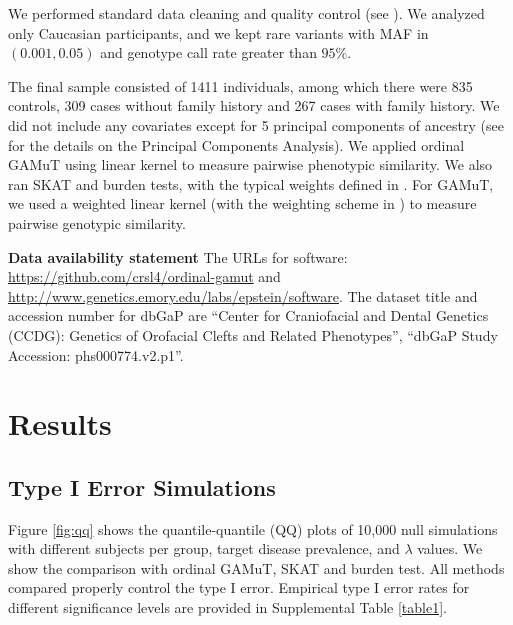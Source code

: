 \documentclass[]{article}
\begin{document}
We performed standard data cleaning and quality control (see \citet{Leslie2016}). We analyzed only Caucasian participants, and we kept rare variants with MAF in \((0.001,0.05)\) and genotype call rate greater than \(95\%\).

The final sample consisted of 1411 individuals, among which there were 835 controls, 309 cases without family history and 267 cases with family history. We did not include any covariates except for 5 principal components of ancestry (see \citet{Leslie2016} for the details on the Principal Components Analysis).
We applied ordinal GAMuT using linear kernel to measure pairwise phenotypic similarity.
We also ran SKAT and burden tests, with the typical weights defined in \citet{Wu2011}. For GAMuT, we used a weighted linear kernel (with the weighting scheme in \citet{Wu2011}) to measure pairwise genotypic similarity.

\textbf{Data availability statement } The URLs for software: \url{https://github.com/crsl4/ordinal-gamut} and \url{http://www.genetics.emory.edu/labs/epstein/software}. The dataset title and accession number for dbGaP are ``Center for Craniofacial and Dental Genetics (CCDG): Genetics of Orofacial Clefts and Related Phenotypes'', ``dbGaP Study Accession: phs000774.v2.p1''.

\hypertarget{results}{%
\section{Results}\label{results}}

\hypertarget{type-i-error-simulations}{%
\subsection{Type I Error Simulations}\label{type-i-error-simulations}}

Figure \ref{fig:qq} shows the quantile-quantile (QQ) plots of 10,000 null simulations with different subjects per group, target disease prevalence, and \(\lambda\) values. We show the comparison with ordinal GAMuT, SKAT and burden test. All methods compared properly control the type I error. Empirical type I error rates for different significance levels are provided in Supplemental Table \ref{table1}.
\end{document}
